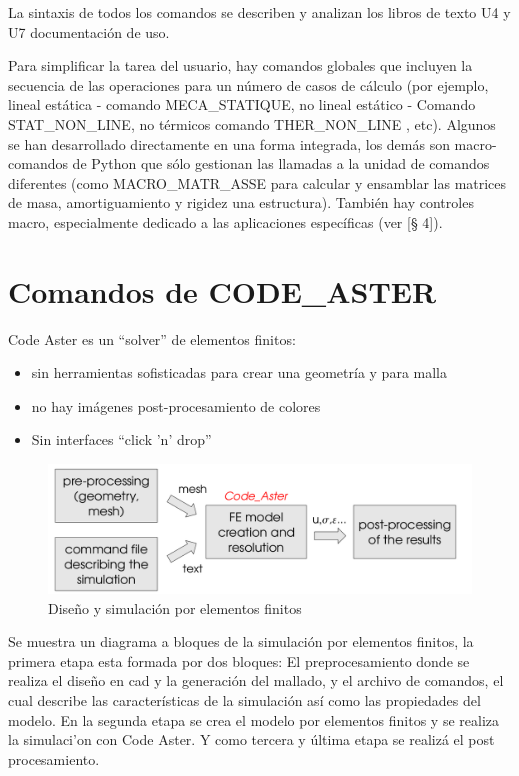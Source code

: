 \documentclass[12pt]{book}
\theoremstyle{definition}
\theoremstyle{remark}
\theoremstyle{plain}
\begin{document}
La sintaxis de todos los comandos se describen y analizan los libros de texto U4 y 
U7 documentación de uso.

Para simplificar la tarea del usuario, hay comandos globales que incluyen la
secuencia de las operaciones para un número de casos de cálculo (por ejemplo, 
lineal estática - comando MECA\_STATIQUE, no lineal estático - Comando 
STAT\_NON\_LINE,
no térmicos comando THER\_NON\_LINE , etc). Algunos se han desarrollado directamente 
en una forma integrada, los demás son macro-comandos de Python que sólo gestionan
las llamadas a la unidad de comandos diferentes (como MACRO\_MATR\_ASSE para calcular
 y ensamblar las matrices de masa, amortiguamiento y rigidez una estructura).
También hay controles macro, especialmente dedicado a las aplicaciones específicas 
(ver [§ 4]).



\chapter{Comandos de CODE\_ASTER}

Code Aster es un ``solver'' de elementos finitos:
\begin{itemize}
 \item sin herramientas sofisticadas para crear una geometría y para malla
 \item no hay imágenes post-procesamiento de colores
 \item Sin interfaces “click 'n' drop”
\end{itemize}

\begin{figure}
\centering
\includegraphics[width=5in]{Procesamiento.png}
\caption{Diseño y simulación por elementos finitos}
\label{fig1}
\end{figure}
Se muestra un diagrama a bloques de la simulación por elementos finitos, la
primera etapa esta formada por dos bloques: El preprocesamiento donde se
realiza el diseño en cad y la generación del mallado, y el archivo de
comandos, el cual describe las características de la simulación así como las
propiedades del modelo. En la segunda etapa se crea el modelo por elementos
finitos y se realiza la simulaci'on con Code Aster. Y como tercera y última
etapa se realizá el post procesamiento.
\end{document}
